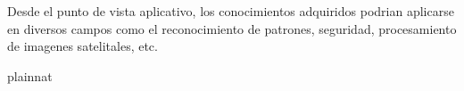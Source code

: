 \documentclass[a4paper,10pt]{report}
\begin{document}
Desde el punto de vista aplicativo, los conocimientos adquiridos podrian aplicarse en diversos campos como el reconocimiento de patrones, seguridad, procesamiento de imagenes satelitales, etc.




 {plainnat}




  
\end{document}
